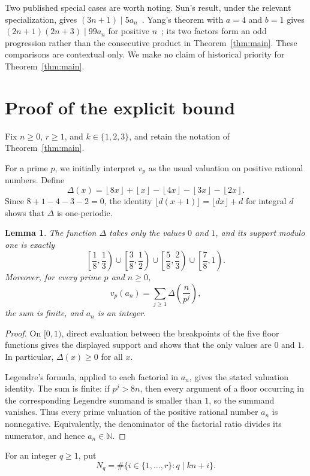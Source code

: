\documentclass[11pt,a4paper]{amsart}
\newtheorem{lemma}[theorem]{Lemma}
\newcommand{\floor}[1]{\left\lfloor #1\right\rfloor}
\begin{document}
Two published special cases are worth noting. Sun's result, under the relevant
specialization, gives $(3n+1)\mid5a_n$~\cite{Sun2012}. Yang's theorem with
$a=4$ and $b=1$ gives $(2n+1)(2n+3)\mid99a_n$ for positive $n$~\cite{Yang2015};
its two factors form an odd progression rather than the consecutive product
in Theorem~\ref{thm:main}. These comparisons are contextual only. We make no
claim of historical priority for Theorem~\ref{thm:main}.

\section{Proof of the explicit bound}

Fix $n\geq0$, $r\geq1$, and $k\in\{1,2,3\}$, and retain the notation of
Theorem~\ref{thm:main}.

For a prime $p$, we initially interpret $v_p$ as the usual valuation on
positive rational numbers. Define
\[
 \Delta(x)=\floor{8x}+\floor{x}
 -\floor{4x}-\floor{3x}-\floor{2x}.
\]
Since $8+1-4-3-2=0$, the identity
$\lfloor d(x+1)\rfloor=\lfloor dx\rfloor+d$ for integral $d$ shows that
$\Delta$ is one-periodic.

\begin{lemma}\label{lem:landau}
The function $\Delta$ takes only the values $0$ and $1$, and its support
modulo one is exactly
\[
 \left[\frac18,\frac13\right)
 \cup\left[\frac38,\frac12\right)
 \cup\left[\frac58,\frac23\right)
 \cup\left[\frac78,1\right).
\]
Moreover, for every prime $p$ and $n\geq0$,
\[
 v_p(a_n)=\sum_{j\geq1}\Delta\!\left(\frac{n}{p^j}\right),
\]
the sum is finite, and $a_n$ is an integer.
\end{lemma}

\begin{proof}
On $[0,1)$, direct evaluation between the breakpoints of the five floor
functions gives the displayed support and shows that the only values are $0$
and $1$. In particular, $\Delta(x)\geq0$ for all $x$.

Legendre's formula, applied to each factorial in $a_n$, gives the stated
valuation identity. The sum is finite: if $p^j>8n$, then every argument of a
floor occurring in the corresponding Legendre summand is smaller than $1$,
so the summand vanishes. Thus every prime valuation of the positive rational
number $a_n$ is nonnegative. Equivalently, the denominator of the factorial
ratio divides its numerator, and hence $a_n\in\mathbb{N}$.
\end{proof}

For an integer $q\geq1$, put
\[
 N_q=\#\{i\in\{1,\ldots,r\}:q\mid kn+i\}.
\]
\end{document}
